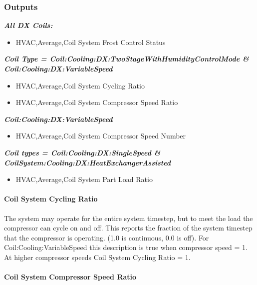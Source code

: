 \subsubsection{Outputs}\label{outputs-19}

\textbf{\emph{All DX Coils:}}

\begin{itemize}
\tightlist
\item
  HVAC,Average,Coil System Frost Control Status
\end{itemize}

\textbf{\emph{Coil Type = Coil:Cooling:DX:TwoStageWithHumidityControlMode \& Coil:Cooling:DX:VariableSpeed}}

\begin{itemize}
\item
  HVAC,Average,Coil System Cycling Ratio
\item
  HVAC,Average,Coil System Compressor Speed Ratio
\end{itemize}

\textbf{\emph{Coil:Cooling:DX:VariableSpeed}}

\begin{itemize}
\item
  HVAC,Average,Coil System Compressor Speed Number
\end{itemize}

\textbf{\emph{Coil types = Coil:Cooling:DX:SingleSpeed \& CoilSystem:Cooling:DX:HeatExchangerAssisted}}

\begin{itemize}
\tightlist
\item
  HVAC,Average,Coil System Part Load Ratio
\end{itemize}

\paragraph{Coil System Cycling Ratio}\label{coil-system-cycling-ratio}

The system may operate for the entire system timestep, but to meet the load the compressor can cycle on and off. This reports the fraction of the system timestep that the compressor is operating. (1.0 is continuous, 0.0 is off). For Coil:Cooling:VariableSpeed this description is true when compressor speed = 1. At higher compressor speeds Coil System Cycling Ratio = 1.

\paragraph{Coil System Compressor Speed Ratio}

